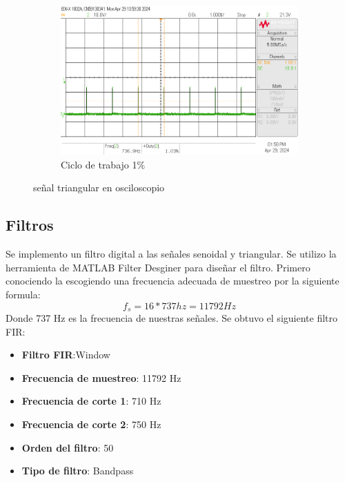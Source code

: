 \documentclass{article}
\begin{document}
\begin{figure}[H]
\begin{subfigure}{.3\textwidth}
    \end{subfigure}
    \hfill
    \begin{subfigure}{.3\textwidth}
        \centering
        \includegraphics[width=\linewidth]{images/scope_3.png}
        \caption{Ciclo de trabajo 1\%}
        \label{fig:triangular_3}
    \end{subfigure}
    \caption{señal triangular en osciloscopio}
    \label{fig:triangular}
\end{figure}
\subsection{Filtros}
Se implemento un filtro digital a las señales senoidal y triangular. Se utilizo la herramienta de MATLAB Filter Desginer para diseñar el filtro. 
Primero conociendo la escogiendo una frecuencia adecuada de muestreo por la siguiente formula:
\begin{equation}
    f_s = 16 * 737 hz = 11792 Hz
\end{equation}
Donde 737 Hz es la frecuencia de nuestras señales.
Se obtuvo el siguiente filtro FIR:
\begin{itemize}
    \item \textbf{Filtro FIR}:Window
    \item \textbf{Frecuencia de muestreo}:  11792 Hz
    \item \textbf{Frecuencia de corte 1}: 710 Hz
    \item \textbf{Frecuencia de corte 2}: 750 Hz
    \item \textbf{Orden del filtro}: 50
    \item \textbf{Tipo de filtro}: Bandpass
\end{itemize}
\end{document}
